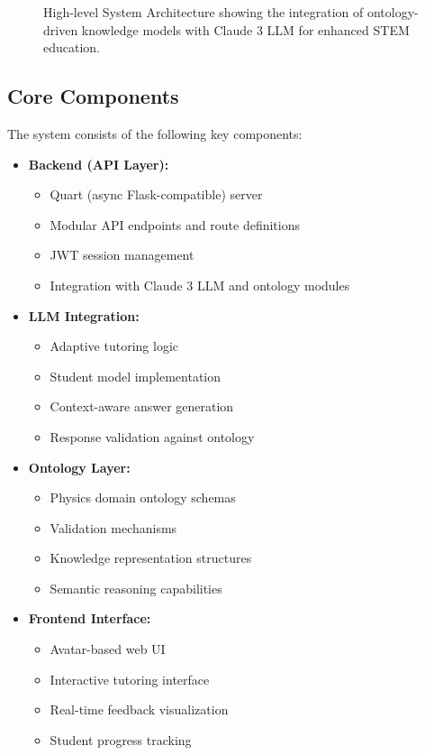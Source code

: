 \begin{figure}[htbp]
    \centering
    
    \caption{High-level System Architecture showing the integration of ontology-driven knowledge models with Claude 3 LLM for enhanced STEM education.}
    \label{fig:system-architecture}
\end{figure}

\subsection{Core Components}
\label{subsec:core-components}

The system consists of the following key components:

\begin{itemize}
    \item \textbf{Backend (API Layer):} 
        \begin{itemize}
            \item Quart (async Flask-compatible) server
            \item Modular API endpoints and route definitions
            \item JWT session management
            \item Integration with Claude 3 LLM and ontology modules
        \end{itemize}
    
    \item \textbf{LLM Integration:} \cite{vu2024freshllms}
        \begin{itemize}
            \item Adaptive tutoring logic
            \item Student model implementation
            \item Context-aware answer generation
            \item Response validation against ontology
        \end{itemize}
    
    \item \textbf{Ontology Layer:} \cite{mendel2024hypercubes}
        \begin{itemize}
            \item Physics domain ontology schemas
            \item Validation mechanisms
            \item Knowledge representation structures
            \item Semantic reasoning capabilities
        \end{itemize}
    
    \item \textbf{Frontend Interface:} 
        \begin{itemize}
            \item Avatar-based web UI
            \item Interactive tutoring interface
            \item Real-time feedback visualization
            \item Student progress tracking
        \end{itemize}
\end{itemize}


